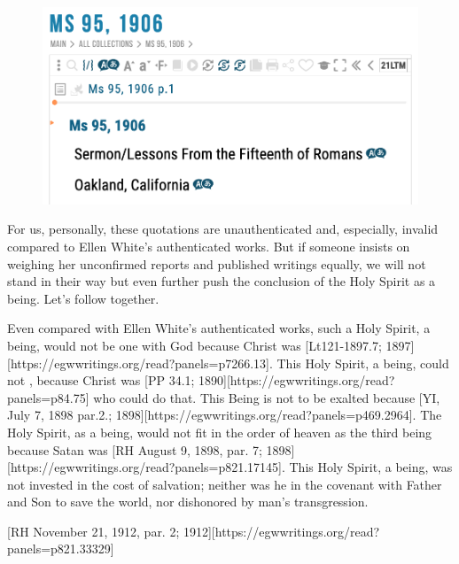 \begin{figure}
    \centering
    \includegraphics[width=1\linewidth]{images/sermons-and-talks.png}
    \label{fig:enter-label}
\end{figure}

For us, personally, these quotations are unauthenticated and, especially, invalid compared to Ellen White’s authenticated works. But if someone insists on weighing her unconfirmed reports and published writings equally, we will not stand in their way but even further push the conclusion of the Holy Spirit as a being. Let’s follow together.

Even compared with Ellen White’s authenticated works, such a Holy Spirit, a being, would not be one with God because Christ was [Lt121-1897.7; 1897][https://egwwritings.org/read?panels=p7266.13]. This Holy Spirit, a being, could not , because Christ was [PP 34.1; 1890][https://egwwritings.org/read?panels=p84.75] who could do that. This Being is not to be exalted because [YI, July 7, 1898 par.2.; 1898][https://egwwritings.org/read?panels=p469.2964]. The Holy Spirit, as a being, would not fit in the order of heaven as the third being because Satan was [RH August 9, 1898, par. 7; 1898][https://egwwritings.org/read?panels=p821.17145]. This Holy Spirit, a being, was not invested in the cost of salvation; neither was he in the covenant with Father and Son to save the world, nor dishonored by man’s transgression.

[RH November 21, 1912, par. 2; 1912][https://egwwritings.org/read?panels=p821.33329]

